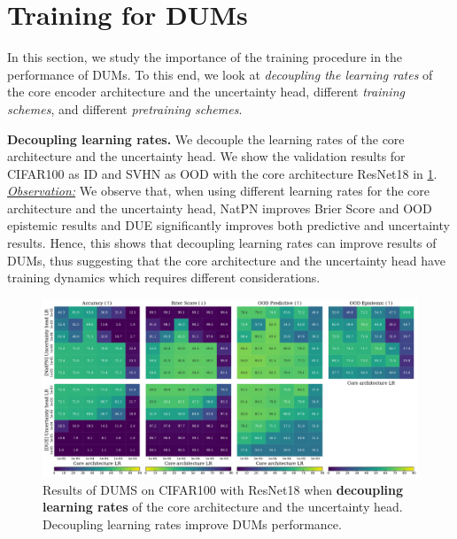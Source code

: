 \section{Training for DUMs}
\label{sec:training}

In this section, we study the importance of the training procedure in the performance of DUMs. To this end, we look at \emph{decoupling the learning rates} of the core encoder architecture and the uncertainty head, different \emph{training schemes}, and different \emph{pretraining schemes}.

\textbf{Decoupling learning rates.} We decouple the learning rates of the core architecture and the uncertainty head. We show the validation results for CIFAR100 as ID and SVHN as OOD with the core architecture ResNet18 in \cref{fig:decoupled_test}.
\underline{\textit{Observation:}} We observe that, when using different learning rates for the core architecture and the uncertainty head, NatPN improves Brier Score and OOD epistemic results and DUE significantly improves both predictive and uncertainty results. Hence, this shows that decoupling learning rates can improve results of DUMs, thus suggesting that the core architecture and the uncertainty head have training dynamics which requires different considerations.

\begin{figure}[!htb]
    \centering
    \includegraphics[width=0.8\linewidth]{sections/008_iclr2023/figures/decoupled_test.pdf}
    \caption{Results of DUMS on CIFAR100 with ResNet18 when \textbf{decoupling learning rates} of the core architecture and the uncertainty head. Decoupling learning rates improve DUMs performance. }
    \label{fig:decoupled_test}
\end{figure}

